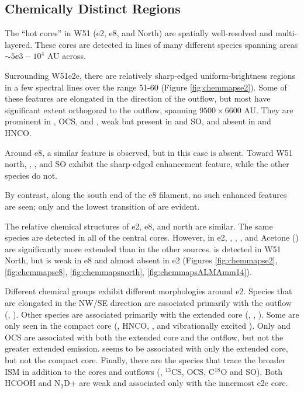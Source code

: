 \documentclass{aa}
\begin{document}

\subsection{Chemically Distinct Regions}
\label{sec:chemistrymaps}
\label{sec:chemistrymapsobs}
The ``hot cores'' in W51 (e2, e8, and North) are spatially well-resolved and
multi-layered.  These cores are detected in lines of many different species
spanning areas $\sim5\ee{3}-10^4$ AU across.

Surrounding W51e2e, there are relatively sharp-edged uniform-brightness regions
in a few spectral lines over the range 51-60 \kms (Figure
\ref{fig:chemmapse2}).  Some of these features are elongated in the direction
of the outflow, but most have significant extent orthogonal to the outflow,
spanning $9500\times6600$ AU.  They are prominent in \methanol, OCS, and
\dimethylether, weak but present in \formaldehyde and SO, and absent in
\cyanoacetylene and HNCO.

Around e8, a similar feature is observed, but in this case \dimethylether is absent.
Toward W51 north, \methanol, \formaldehyde, and SO exhibit the sharp-edged
enhancement feature, while the other species do not.

By contrast, along the south end of the e8 filament, no such enhanced features
are seen; only \formaldehyde and the lowest transition of \methanol are
evident.

The relative chemical structures of e2, e8, and north are  similar.
The same species are detected in all of the central cores.  However, in e2,
\dimethylether, \methylformate, \ethylcyanide, and Acetone (\acetone) are
significantly more extended than in the other sources.
\gaucheethanol is detected in W51 North, but is weak in e8 and almost absent
in e2 (Figures \ref{fig:chemmapse2}, \ref{fig:chemmapse8},
\ref{fig:chemmapsnorth}, \ref{fig:chemmapsALMAmm14}).

Different chemical groups exhibit different morphologies around e2.  Species that
are elongated in the NW/SE direction are associated primarily with the outflow
(\cyanoacetylene, \ethylcyanide).  Other species are associated primarily with
the extended core (\methylformate, \dimethylether, \acetone).  Some are only
seen in the compact core (\methyleneamidogen, HNCO, \formamide, and
vibrationally excited \cyanoacetylene).  Only \methanol and OCS are associated
with both the extended core and the outflow, but not the greater extended
emission.  \ketene seems to be associated with only the extended core, but not
the compact core. Finally, there are the species that trace the broader ISM in
addition to the cores and outflows (\formaldehyde, $^{13}$CS, OCS, C$^{18}$O
and SO).  Both HCOOH and N$_2$D+ are weak and associated only with the innermost
e2e core.
\end{document}
